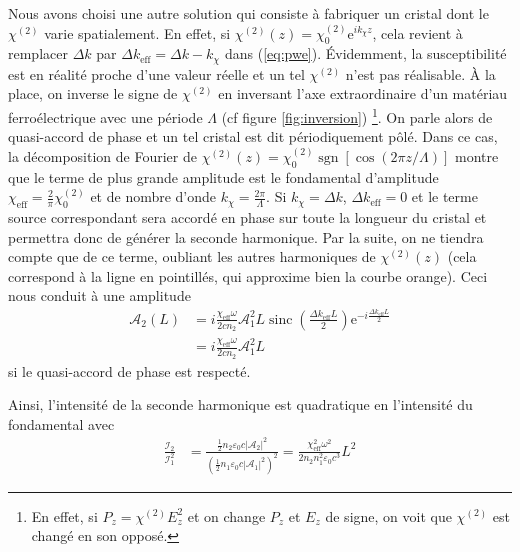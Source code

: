\documentclass[11pt,a4paper] { article}
\newcommand{\A}{\mathcal{A}}
\newcommand{\e}[1]{\text{e}^{#1}}
\newcommand{\mathsc}[1]{\mathrm{\scriptscriptstyle {#1}}}
\begin{document}
Nous avons choisi une autre solution qui consiste à fabriquer un cristal dont le $\chi^{(2)}$ varie spatialement. En effet, si $\chi^{(2)}(z) = \chi^{(2)}_0 \e{i k_\chi z}$, cela revient à remplacer $\Delta k$ par $\boxed{ \Delta k_\mathsc{eff} = \Delta k - k_\chi }$ dans (\ref{eq:pwe}). 
Évidemment, la susceptibilité est en réalité proche d'une valeur réelle et un tel $\chi^{(2)}$ n'est pas réalisable. À la place, on inverse le signe de $\chi^{(2)}$ en inversant l'axe extraordinaire d'un matériau ferroélectrique avec une période $\Lambda$ (cf figure \ref{fig:inversion}) \footnote{En effet, si $P_z = \chi^{(2)} E_z^2$ et on change $P_z$ et $E_z$ de signe, on voit que $\chi^{(2)}$ est changé en son opposé.}.
On parle alors de quasi-accord de phase et un tel cristal est dit périodiquement pôlé. Dans ce cas, la décomposition de Fourier de $\chi^{(2)}(z) = \chi^{(2)}_0 \operatorname{sgn}[\cos(2\pi z/ \Lambda)]$ montre que le terme de plus grande amplitude est le fondamental d'amplitude $\boxed{ \chi_\mathsc{eff} = \frac2\pi \chi^{(2)}_0 }$ et de nombre d'onde $\boxed{ k_\chi = \frac{2\pi}{\Lambda} }$. 
Si $k_\chi = \Delta k$, $\Delta k_\mathsc{eff} = 0$ et le terme source correspondant sera accordé en phase sur toute la longueur du cristal et permettra donc de générer la seconde harmonique. Par la suite, on ne tiendra compte que de ce terme, oubliant les autres harmoniques de $\chi^{(2)}(z)$ (cela correspond à la ligne en pointillés, qui approxime bien la courbe orange).
Ceci nous conduit à une amplitude 
\begin{align}
	\A_2(L) &= i \frac{\chi_\mathsc{eff}\omega}{2 cn_2} \A_1^2 L \operatorname{sinc}\left( \frac{\Delta k_\mathsc{eff} L}{2} \right) 
	\e{-i\frac{\Delta k_\mathsc{eff} L}{2}} \\	
	&= i \frac{\chi_\mathsc{eff} \omega}{2 cn_2} \A_1^2L 
\end{align}
si le quasi-accord de phase est respecté.

Ainsi, l'intensité de la seconde harmonique est quadratique en l'intensité du fondamental avec
\begin{align}
	\frac{\mathcal I_2}{\mathcal I_1^2} &= \frac{\frac12 n_2 \varepsilon_0 c |\A_2|^2}{\left(\frac12 n_1 \varepsilon_0 c |\A_1|^2\right)^2} 
	= \frac{\chi_\mathsc{eff}^2\omega^2}{2 n_2 n_1^2 \varepsilon_0 c^3} L^2
	\label{eq:plane}
\end{align}
\end{document}
